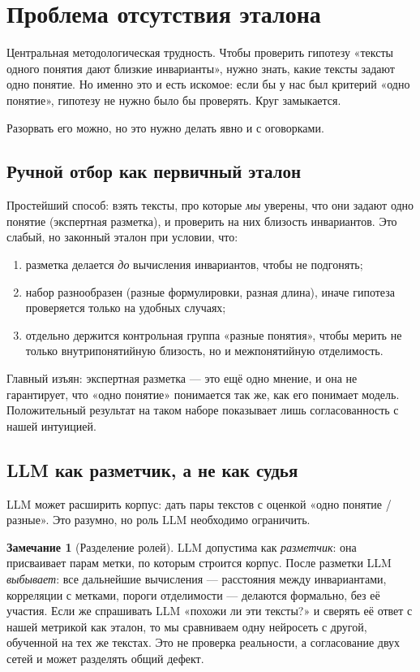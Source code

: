 \documentclass[11pt,a4paper]{article}
\theoremstyle{definition}
\newtheorem{remark}[definition]{Замечание}
\theoremstyle{plain}
\begin{document}
\section{Проблема отсутствия эталона}\label{sec:nogroundtruth}

Центральная методологическая трудность. Чтобы проверить гипотезу «тексты одного понятия дают
близкие инварианты», нужно знать, какие тексты задают одно понятие. Но именно это и есть
искомое: если бы у нас был критерий «одно понятие», гипотезу не нужно было бы проверять. Круг
замыкается.

Разорвать его можно, но это нужно делать явно и с оговорками.

\subsection{Ручной отбор как первичный эталон}

Простейший способ: взять тексты, про которые \emph{мы} уверены, что они задают одно понятие
(экспертная разметка), и проверить на них близость инвариантов. Это слабый, но законный
эталон при условии, что:
\begin{enumerate}[label=(\roman*)]
\item разметка делается \emph{до} вычисления инвариантов, чтобы не подгонять;
\item набор разнообразен (разные формулировки, разная длина), иначе гипотеза проверяется
только на удобных случаях;
\item отдельно держится контрольная группа «разные понятия», чтобы мерить не только
внутрипонятийную близость, но и межпонятийную отделимость.
\end{enumerate}
Главный изъян: экспертная разметка — это ещё одно мнение, и она не гарантирует, что
«одно понятие» понимается так же, как его понимает модель. Положительный результат на таком
наборе показывает лишь согласованность с нашей интуицией.

\subsection{LLM как разметчик, а не как судья}

LLM может расширить корпус: дать пары текстов с оценкой «одно понятие / разные». Это
разумно, но роль LLM необходимо ограничить.

\begin{remark}[Разделение ролей]
LLM допустима как \emph{разметчик}: она присваивает парам метки, по которым строится корпус.
После разметки LLM \emph{выбывает}: все дальнейшие вычисления — расстояния между инвариантами,
корреляции с метками, пороги отделимости — делаются формально, без её участия. Если же
спрашивать LLM «похожи ли эти тексты?» и сверять её ответ с нашей метрикой как эталон, то мы
сравниваем одну нейросеть с другой, обученной на тех же текстах. Это не проверка реальности, а
согласование двух сетей и может разделять общий дефект.
\end{remark}
\end{document}
